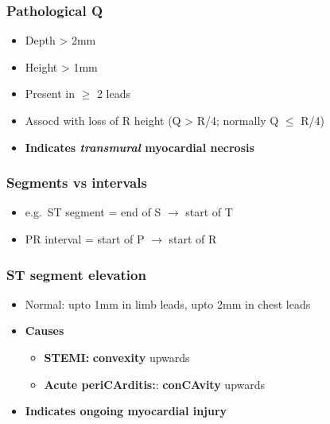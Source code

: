 \documentclass[
  12pt,
]{memoir}
\providecommand{\tightlist}{%
  \setlength{\itemsep}{0pt}\setlength{\parskip}{0pt}}
\begin{document}
\hypertarget{pathological-q}{%
\subsubsection{Pathological Q}\label{pathological-q}}

\begin{itemize}
\tightlist
\item
  Depth \textgreater{} 2mm
\item
  Height \textgreater{} 1mm
\item
  Present in \(\ge\) 2 leads
\item
  Assocd with loss of R height (Q \textgreater{} R/4; normally Q \(\le\)
  R/4)
\item
  \textbf{Indicates \emph{transmural} myocardial necrosis}
\end{itemize}

\hypertarget{segments-vs-intervals}{%
\subsubsection{Segments vs intervals}\label{segments-vs-intervals}}

\begin{itemize}
\tightlist
\item
  e.g.~ST segment = end of S \(\rightarrow\) start of T
\item
  PR interval = start of P \(\rightarrow\) start of R
\end{itemize}

\hypertarget{st-segment-elevation}{%
\subsubsection{ST segment elevation}\label{st-segment-elevation}}

\begin{itemize}
\tightlist
\item
  Normal: upto 1mm in limb leads, upto 2mm in chest leads
\item
  \textbf{Causes}

  \begin{itemize}
  \tightlist
  \item
    \textbf{STEMI:} \textbf{convexity} upwards
  \item
    \textbf{Acute periCArditis:}: \textbf{conCAvity} upwards
  \end{itemize}
\item
  \textbf{Indicates ongoing myocardial injury}
\end{itemize}
\end{document}
